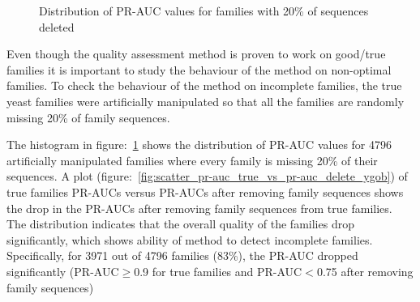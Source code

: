 \documentclass{article}
\begin{document}
		\begin{figure}
			\caption{Distribution of PR-AUC values for families with 20\% of sequences deleted}
			\label{fig:hist_pr-auc_delete_ygob}
		\end{figure}
		
		Even though the quality assessment method is proven to work on good/true families it is important to study the behaviour of the method on non-optimal families. To check the behaviour of the method on incomplete families, the true yeast families were artificially manipulated so that all the families are randomly missing 20\% of family sequences.
		
		The histogram in figure:~\ref{fig:hist_pr-auc_delete_ygob} shows the distribution of PR-AUC values for 4796 artificially manipulated families where every family is missing 20\% of their sequences. A plot (figure:~\ref{fig:scatter_pr-auc_true_vs_pr-auc_delete_ygob}) of true families PR-AUCs versus PR-AUCs after removing family sequences shows the drop in the PR-AUCs after removing family sequences from true families. The distribution indicates that the overall quality of the families drop significantly, which shows ability of method to detect incomplete families. Specifically, for 3971 out of 4796 families (83\%), the PR-AUC dropped significantly (PR-AUC$\geq$0.9 for true families and PR-AUC$<$0.75 after removing family sequences)
		
\end{document}

